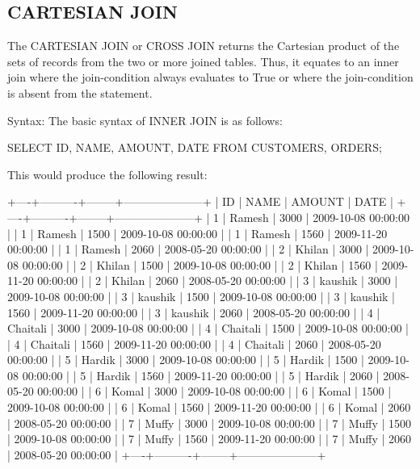 \subsection{CARTESIAN JOIN}

The CARTESIAN JOIN or CROSS JOIN returns the Cartesian product of the sets of records from the two or more joined tables. Thus, it equates to an inner join where the 
join-condition always evaluates to True or where the join-condition is absent from the statement.

Syntax:
The basic syntax of INNER JOIN is as follows:

\begin{Code}
	SELECT  ID, NAME, AMOUNT, DATE
	FROM CUSTOMERS, ORDERS;
\end{Code}

This would produce the following result:

\begin{Code}
	+----+----------+--------+---------------------+
	| ID | NAME     | AMOUNT | DATE                |
	+----+----------+--------+---------------------+
	|  1 | Ramesh   |   3000 | 2009-10-08 00:00:00 |
	|  1 | Ramesh   |   1500 | 2009-10-08 00:00:00 |
	|  1 | Ramesh   |   1560 | 2009-11-20 00:00:00 |
	|  1 | Ramesh   |   2060 | 2008-05-20 00:00:00 |
	|  2 | Khilan   |   3000 | 2009-10-08 00:00:00 |
	|  2 | Khilan   |   1500 | 2009-10-08 00:00:00 |
	|  2 | Khilan   |   1560 | 2009-11-20 00:00:00 |
	|  2 | Khilan   |   2060 | 2008-05-20 00:00:00 |
	|  3 | kaushik  |   3000 | 2009-10-08 00:00:00 |
	|  3 | kaushik  |   1500 | 2009-10-08 00:00:00 |
	|  3 | kaushik  |   1560 | 2009-11-20 00:00:00 |
	|  3 | kaushik  |   2060 | 2008-05-20 00:00:00 |
	|  4 | Chaitali |   3000 | 2009-10-08 00:00:00 |
	|  4 | Chaitali |   1500 | 2009-10-08 00:00:00 |
	|  4 | Chaitali |   1560 | 2009-11-20 00:00:00 |
	|  4 | Chaitali |   2060 | 2008-05-20 00:00:00 |
	|  5 | Hardik   |   3000 | 2009-10-08 00:00:00 |
	|  5 | Hardik   |   1500 | 2009-10-08 00:00:00 |
	|  5 | Hardik   |   1560 | 2009-11-20 00:00:00 |
	|  5 | Hardik   |   2060 | 2008-05-20 00:00:00 |
	|  6 | Komal    |   3000 | 2009-10-08 00:00:00 |
	|  6 | Komal    |   1500 | 2009-10-08 00:00:00 |
	|  6 | Komal    |   1560 | 2009-11-20 00:00:00 |
	|  6 | Komal    |   2060 | 2008-05-20 00:00:00 |
	|  7 | Muffy    |   3000 | 2009-10-08 00:00:00 |
	|  7 | Muffy    |   1500 | 2009-10-08 00:00:00 |
	|  7 | Muffy    |   1560 | 2009-11-20 00:00:00 |
	|  7 | Muffy    |   2060 | 2008-05-20 00:00:00 |
	+----+----------+--------+---------------------+
\end{Code}

